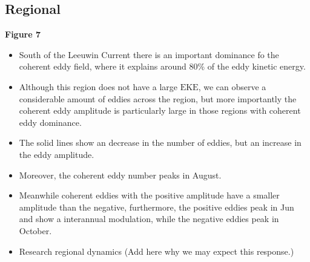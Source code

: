 \documentclass[draft,linenumbers]{agujournal2019}
\newcommand{\MEKE}{\overline{\textrm{EKE}}}
\newcommand{\EKE}{\textrm{EKE}}
\newcommand{\MCEKE}{\overline{\textrm{CEKE}}}
\newcommand{\CEKE}{\textrm{CEKE}}
\begin{document}
	\subsection{Regional}
	\label{subsec:CE_regional_stats}
	

	\textbf{Figure 7}
	\begin{itemize}
		\item South of the Leeuwin Current there is an important dominance fo the coherent eddy field, where it explains around 80\% of the eddy kinetic energy.
		\item Although this region does not have a large $\EKE$, we can observe a considerable amount of eddies across the region, but more importantly the coherent eddy amplitude is particularly large in those regions with coherent eddy dominance. 
		\item The solid lines show an decrease in the number of eddies, but an increase in the eddy amplitude. 
		\item Moreover, the coherent eddy number peaks in August.
		\item Meanwhile coherent eddies with the positive amplitude have a smaller amplitude than the negative, furthermore, the positive eddies peak in Jun and show a interannual modulation, while the negative eddies peak in October. 
		\item Research regional dynamics (Add here why we may expect this response.)
	\end{itemize}
\end{document}
